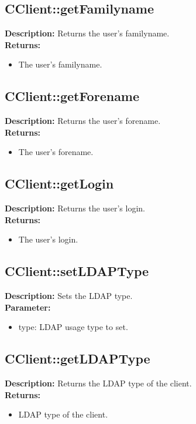 \subsection{CClient::getFamilyname}
\textbf{Description:} Returns the user's familyname.\\
\textbf{Returns:}
\begin{itemize}
\item The user's familyname.
\end{itemize}

\subsection{CClient::getForename}
\textbf{Description:} Returns the user's forename.\\
\textbf{Returns:}
\begin{itemize}
\item The user's forename.
\end{itemize}

\subsection{CClient::getLogin}
\textbf{Description:} Returns the user's login.\\
\textbf{Returns:}
\begin{itemize}
\item The user's login.
\end{itemize}

\subsection{CClient::setLDAPType}
\textbf{Description:} Sets the LDAP type.\\
\textbf{Parameter:}
\begin{itemize}
\item type: LDAP usage type to set.
\end{itemize}

\subsection{CClient::getLDAPType}
\textbf{Description:} Returns the LDAP type of the client.\\
\textbf{Returns:}
\begin{itemize}
\item LDAP type of the client.
\end{itemize}

